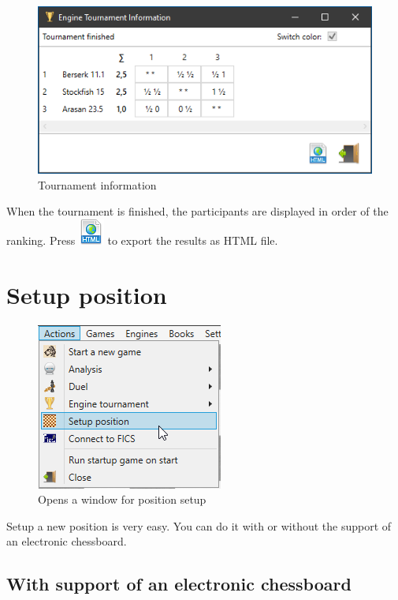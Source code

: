 \documentclass[11pt,a4paper]{article}
\begin{document}
\begin{figure}[H]
	\centering
	\includegraphics[scale=0.8]{EngineTournament10.png}
	\caption{Tournament information}
	\label{fig:EngineTournament10}
\end{figure}
When the tournament is finished, the participants are displayed in order of the ranking.
Press \includegraphics[scale=0.5]{file_extension_html.png} to export the results as HTML file.


\section{Setup position} \label{SetupPosition}

\begin{figure}[H]
	\centering
	\includegraphics[scale=1.0]{SetupPosition1.png}
	\caption{Opens a window for position setup}
	\label{fig:SetupPosition1}
\end{figure}

Setup a new position is very easy. You can do it with or without the support of an electronic chessboard.

\subsection{With support of an electronic chessboard}
\end{document}
